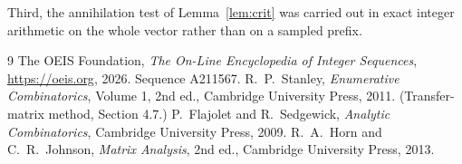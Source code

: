 \documentclass[11pt,a4paper]{article}
\theoremstyle{plain}
\theoremstyle{definition}
\begin{document}
Third, the annihilation test of Lemma~\ref{lem:crit} was carried out in exact integer
arithmetic on the whole vector rather than on a sampled prefix.

\begin{thebibliography}{9}
 The OEIS Foundation, \emph{The On-Line Encyclopedia of Integer
Sequences}, \url{https://oeis.org}, 2026. Sequence A211567.
 R.~P.~Stanley, \emph{Enumerative Combinatorics}, Volume 1, 2nd ed.,
Cambridge University Press, 2011. (Transfer-matrix method, Section 4.7.)
 P.~Flajolet and R.~Sedgewick, \emph{Analytic Combinatorics}, Cambridge
University Press, 2009.
 R.~A.~Horn and C.~R.~Johnson, \emph{Matrix Analysis}, 2nd ed., Cambridge
University Press, 2013.
\end{thebibliography}
\end{document}
